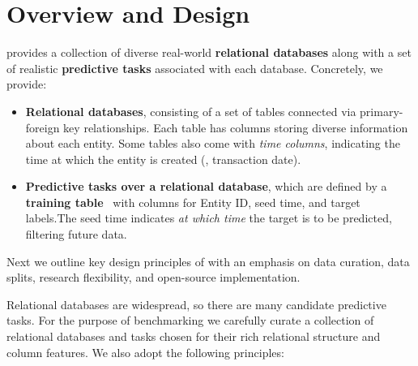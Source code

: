 \vspace{-5pt}
\section{Overview and Design}
\label{sec:design}
\vspace{-5pt}



\relbench provides a collection of diverse real-world \textbf{relational databases} along with a set of realistic \textbf{predictive tasks} associated with each database. Concretely, we provide:

\vspace{-5pt}
\begin{itemize}[leftmargin=0.6cm,itemsep=3pt, parsep=0pt]
    \item \textbf{Relational databases}, consisting of a set of tables connected via primary-foreign key relationships. Each table has columns storing diverse information about each entity. Some tables also come with \emph{time columns}, indicating the time at which the entity is created (\eg, transaction date). %
    \item \textbf{Predictive tasks over a relational database}, which are defined by a \textbf{training table}~\citep{fey2023relational} with columns for Entity ID, seed time, and target labels.The seed time indicates \emph{at which time} the target is to be predicted, filtering future data. 
\end{itemize}


Next we outline key design principles of \relbench with an emphasis on data curation, data splits, research flexibility, and open-source implementation.

 Relational databases are widespread, so there are many candidate predictive tasks. 
For the purpose of benchmarking we carefully curate a collection of relational databases and tasks chosen for their rich relational structure and column features. We also adopt the following principles:


